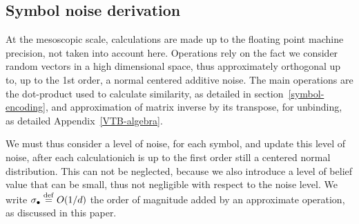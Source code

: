 \documentclass[sn-mathphys]{sn-jnl}
\newcommand{\defq}{\stackrel {\rm def}{=}}
\begin{document}
\begin{appendices}
\subsection*{Symbol noise derivation}

At the mesoscopic scale, calculations are made up to the floating point machine precision, not taken into account here.
Operations rely on the fact we consider random vectors in a high dimensional space, thus approximately orthogonal up to, up to the 1st order, a normal centered additive noise. The main operations are the dot-product used to calculate similarity, as detailed in section~\ref{symbol-encoding}, and approximation of matrix inverse by its transpose, for unbinding, as detailed Appendix~\ref{VTB-algebra}.

We must thus consider a level of noise, for each symbol, and update this level of noise, after each calculationich is up to the first order still a centered normal distribution. This can not be neglected, because we also introduce a level of belief value that can be small, thus not negligible with respect to the noise level. We write $\sigma_\bullet \defq O(1/d)$ the order of magnitude added by an approximate operation, as discussed in this paper.


\end{appendices}
\end{document}
